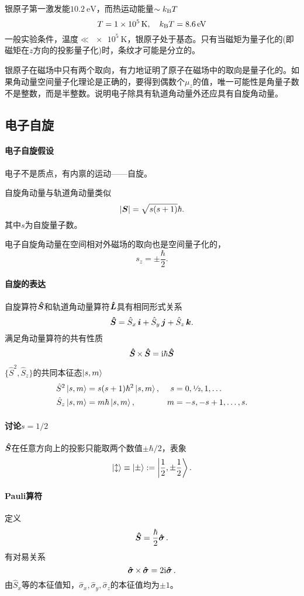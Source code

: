 银原子第一激发能$\SI{10.2}\eV$，而热运动能量$\sim k_{\mathrm B} T$
\[T=\SI{1e5}\K,\quad \kB T=\SI{8.6}\eV\]
一般实验条件，温度$\ll\SI{e5}\K$，银原子处于基态。只有当磁矩为量子化的(即磁矩在$z$方向的投影量子化)时，条纹才可能是分立的。

银原子在磁场中只有两个取向，有力地证明了原子在磁场中的取向是量子化的。如果角动量空间量子化理论是正确的，要得到偶数个$\mu_z$的值，唯一可能性是角量子数不是整数，而是半整数。说明电子除具有轨道角动量外还应具有自旋角动量。

\subsection{电子自旋}
\paragraph*{电子自旋假设}
\begin{compactenum}
	\item 电子不是质点，有内禀的运动——自旋。%
	\item 自旋角动量与轨道角动量类似
		\[\left\lvert\bm S\right\rvert=\sqrt{s(s+1)}\hbar.\]
		其中$s$为自旋量子数。
	\item 电子自旋角动量在空间相对外磁场的取向也是空间量子化的，
		\[s_z=\pm\frac{\hbar}2.\]
\end{compactenum}
\paragraph*{自旋的表达}自旋算符$\bm{\hat S}\!\mathop{}$和轨道角动量算符$\bm{\hat L}\!\mathop{}$具有相同形式关系
\[\bm{\hat S}\!\mathop{}=\hat S_x\,\bm i+\hat S_y\,\bm j+\hat S_z\,\bm k.\]
满足角动量算符的共有性质
\begin{gather}
	\qo S\times\,\qo S=\i\hbar\qo S %
\end{gather}
$\{\hat S^2,\hat S_z\}$的共同本征态$\left\vert s,m\right\rangle$
\begin{align}
	\hat S^2\left\vert s,m\right\rangle&=s(s+1)\hbar^2\left\vert s,m\right\rangle,&s&=0,\text{\sfrac12},1,\ldots\\
	\hat S_z\left\vert s,m\right\rangle&=m\hbar\left\vert s,m\right\rangle,&m&=-s,-s+1,\ldots,s.
\end{align}
\paragraph*{讨论$s=1/2$}$\bm{\hat S}\!\mathop{}$在任意方向上的投影只能取两个数值$\pm\hbar/2$，表象 
\[\left\vert \updownarrow\right\rangle\equiv\left\vert \pm\right\rangle:=\left\vert \frac12,\pm\frac12\right\rangle.\]
\paragraph*{Pauli算符}定义 
\[\bm{\hat S}\!\mathop{}=\frac\hbar{2}\bm{\hat \sigma}\!\mathop{}.\]
有对易关系
\[\bm{\hat \sigma}\!\mathop{}\times\,\bm{\hat \sigma}\!\mathop{}=2\mathrm{i}\bm{\hat \sigma}\!\mathop{}.\]
由$\hat S_x$等的本征值知，$\hat\sigma_x,\hat\sigma_y,\hat\sigma_z$的本征值均为$\pm 1$。

